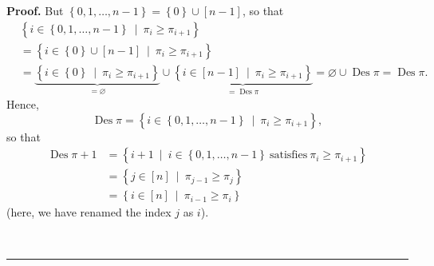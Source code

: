 \documentclass[numbers=enddot,12pt,final,onecolumn,notitlepage]{scrartcl}%
\theoremstyle{definition}
\newenvironment{proof}[1][Proof]{\noindent\textbf{#1.} }{\ \rule{0.5em}{0.5em}}
\newenvironment{verlong}{}{}
\begin{document}
\begin{verlong}
\begin{proof}
But $\left\{  0,1,\ldots,n-1\right\}  =\left\{  0\right\}  \cup\left[
n-1\right]  $, so that
\begin{align*}
&  \left\{  i\in\left\{  0,1,\ldots,n-1\right\}  \ \mid\ \pi_{i}\geq\pi
_{i+1}\right\} \\
&  =\left\{  i\in\left\{  0\right\}  \cup\left[  n-1\right]  \ \mid\ \pi
_{i}\geq\pi_{i+1}\right\} \\
&  =\underbrace{\left\{  i\in\left\{  0\right\}  \ \mid\ \pi_{i}\geq\pi
_{i+1}\right\}  }_{=\varnothing}\cup\underbrace{\left\{  i\in\left[
n-1\right]  \ \mid\ \pi_{i}\geq\pi_{i+1}\right\}  }_{=\operatorname{Des}\pi
}=\varnothing\cup\operatorname{Des}\pi=\operatorname{Des}\pi.
\end{align*}
Hence,%
\[
\operatorname{Des}\pi=\left\{  i\in\left\{  0,1,\ldots,n-1\right\}
\ \mid\ \pi_{i}\geq\pi_{i+1}\right\}  ,
\]
so that%
\begin{align}
\operatorname{Des}\pi+1  &  =\left\{  i+1\ \mid\ i\in\left\{  0,1,\ldots
,n-1\right\}  \ \text{satisfies}\ \pi_{i}\geq\pi_{i+1}\right\} \nonumber\\
&  =\left\{  j\in\left[  n\right]  \ \mid\ \pi_{j-1}\geq\pi_{j}\right\}
\nonumber\\
&  =\left\{  i\in\left[  n\right]  \ \mid\ \pi_{i-1}\geq\pi_{i}\right\}
\label{pf.prop.Epk.through-Des.Des+1}%
\end{align}
(here, we have renamed the index $j$ as $i$).


\end{proof}
\end{verlong}
\end{document}
